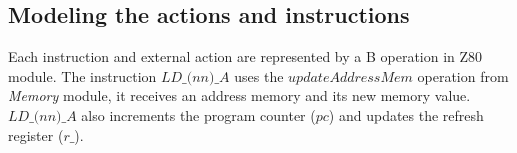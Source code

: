 \documentclass[a4paper]{llncs}
\begin{document}
%

\subsection{Modeling the actions and instructions}
Each instruction and external action are represented by a B operation in Z80 module. 
The instruction $\textit{LD\_(nn)\_A}$ uses the $\textit{updateAddressMem}$
operation from \textit{Memory} module, it receives an address memory
and its new memory value. $\textit{LD\_(nn)\_A}$ also increments the
program counter ($\textit{pc}$) and updates the refresh register
($\textit{r\_}$). 
\end{document}
